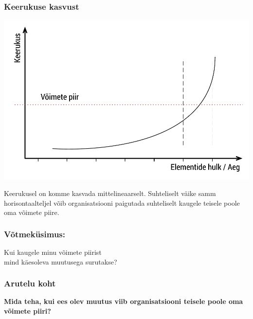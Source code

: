 \begin{frame}[fragile]
  \frametitle{Keerukuse kasvust}
  	\begin{center}
			\includegraphics[width=.7\textwidth]{keerukus.pdf}
	\end{center}
	Keerukusel on komme kasvada mittelineaarselt. Suhteliselt väike samm horisontaalteljel võib organisatsiooni paigutada suhteliselt kaugele teisele poole oma võimete piire. 
\end{frame}

\begin{frame}[fragile]
	\frametitle{Võtmeküsimus:}
	\vfill
	\begin{center}
		Kui kaugele minu võimete piirist \\mind käesoleva muutusega surutakse?
	\end{center}
	\vfill
\end{frame}

\begin{frame}[fragile]
  \frametitle{Arutelu koht}
		\begin{center}
			\textbf{Mida teha, kui ees olev muutus viib organisatsiooni teisele poole oma võimete piiri?}
		\end{center}
\end{frame}



